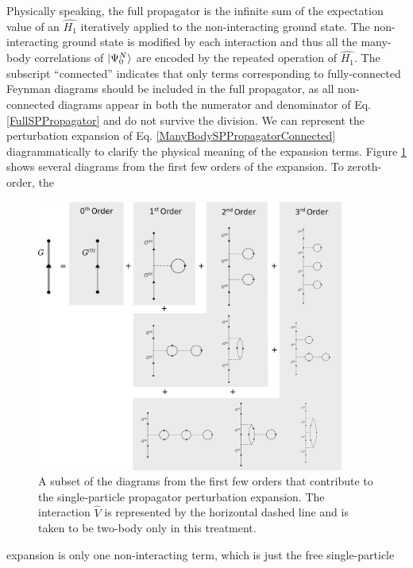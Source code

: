 Physically speaking, the full propagator is the infinite sum of the expectation value of 
an $\hat{H_{1}}$ iteratively applied to the non-interacting ground state. The
non-interacting ground state is modified by each interaction and thus all the many-body correlations
of $\ket{\Psi^{N}_{0}}$ are encoded by the repeated operation of $\hat{H_{1}}$. The subscript
``connected'' indicates that only terms corresponding to fully-connected Feynman 
diagrams should be included in the full propagator, as all non-connected diagrams appear in both 
the numerator and denominator of Eq. \ref{FullSPPropagator} and do not survive
the division.
We can represent the perturbation expansion of Eq. \ref{ManyBodySPPropagatorConnected}
diagrammatically to clarify the physical meaning of the expansion terms. Figure
\ref{PerturbationExpansionDiagram} shows several diagrams from the first few orders of the
expansion. To zeroth-order, the
\begin{figure}[H]
    \centering
    \includegraphics[width=0.9\textwidth]{figures/SecondOrder.png}
    \caption[Example diagrams of the single-particle propagator perturbation expansion]
    {
        A subset of the diagrams from the first few orders that contribute to the 
        single-particle propagator perturbation expansion.
        The interaction $\hat{V}$ is represented by the horizontal
        dashed line and is taken to be two-body only in this treatment.
    }
    \label{PerturbationExpansionDiagram}
\end{figure}
\noindent
expansion is only one non-interacting term, which is just the free single-particle 
